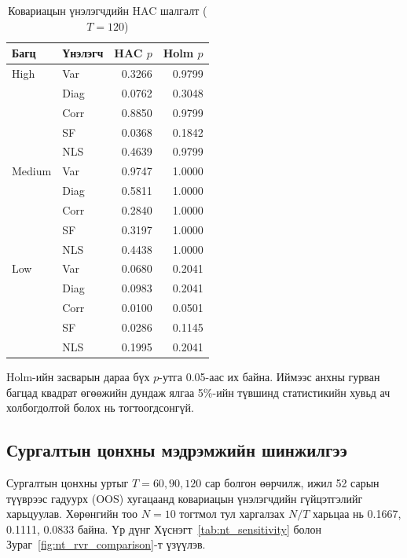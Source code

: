 \begin{table}[htbp]
	\centering
	\caption{Ковариацын үнэлэгчдийн HAC шалгалт ($T=120$)}
	\label{tab:hac_comparison}
	\small
	\begin{tabular}{llrr}
		\hline
		Багц & Үнэлэгч & HAC $p$ & Holm $p$\\
		\hline
		High & Var  & 0.3266 & 0.9799\\
		& Diag & 0.0762 & 0.3048\\
		& Corr & 0.8850 & 0.9799\\
		& SF   & 0.0368 & 0.1842\\
		& NLS  & 0.4639 & 0.9799\\
		\hline
		Medium & Var  & 0.9747 & 1.0000\\
		& Diag & 0.5811 & 1.0000\\
		& Corr & 0.2840 & 1.0000\\
		& SF   & 0.3197 & 1.0000\\
		& NLS  & 0.4438 & 1.0000\\
		\hline
		Low & Var  & 0.0680 & 0.2041\\
		& Diag & 0.0983 & 0.2041\\
		& Corr & 0.0100 & 0.0501\\
		& SF   & 0.0286 & 0.1145\\
		& NLS  & 0.1995 & 0.2041\\
		\hline
	\end{tabular}
\end{table}

Holm-ийн засварын дараа бүх $p$-утга
0.05-аас их байна. Иймээс анхны гурван
багцад квадрат өгөөжийн дундаж ялгаа
5\%-ийн түвшинд статистикийн хувьд
ач холбогдолтой болох нь тогтоогдсонгүй.


\subsection{Сургалтын цонхны мэдрэмжийн шинжилгээ}
\label{subsec:sensitivity_results}

Сургалтын цонхны уртыг $T=60,90,120$ сар болгон
өөрчилж, ижил 52 сарын түүврээс гадуурх (OOS)
хугацаанд ковариацын үнэлэгчдийн гүйцэтгэлийг
харьцуулав. Хөрөнгийн тоо $N=10$ тогтмол тул
харгалзах $N/T$ харьцаа нь 0.1667, 0.1111,
0.0833 байна. Үр дүнг
Хүснэгт~\ref{tab:nt_sensitivity} болон
Зураг~\ref{fig:nt_rvr_comparison}-т үзүүлэв.

